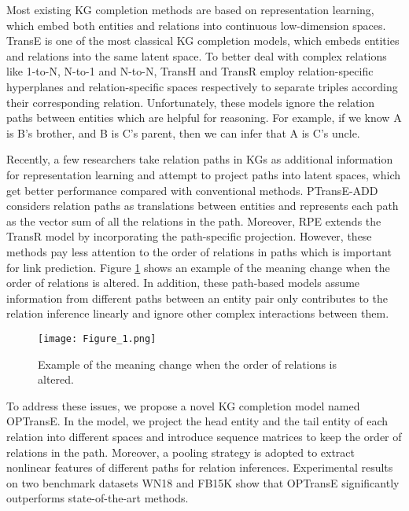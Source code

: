 \documentclass[11pt,a4paper]{article}
\begin{document}
Most existing KG completion methods are based on representation
learning, which embed both entities and relations into continuous
low-dimension spaces. TransE \cite{bordes2013translating} is one of
the most classical KG completion models, which embeds entities and
relations into the same latent space. To better deal with complex
relations like 1-to-N, N-to-1 and N-to-N, TransH
\cite{wang2014knowledge} and TransR \cite{lin2015learning} employ
relation-specific hyperplanes and relation-specific spaces respectively to
separate triples according their corresponding relation. Unfortunately, these
models ignore the relation paths between entities which are helpful
for reasoning. For example, if we know A is B's brother, and B is
C's parent, then we can infer that A is C's uncle.

Recently, a few researchers take relation paths in KGs as additional
information for representation learning and attempt to project paths
into latent spaces, which get better performance compared with
conventional methods. PTransE-ADD \cite{lin2015modeling} considers
relation paths as translations between entities and represents each
path as the vector sum of all the relations in the path. Moreover,
RPE \cite{lin2018relation} extends the TransR model by incorporating
the path-specific projection. However, these methods pay less
attention to the order of relations in paths which is important for
link prediction. Figure \ref{example} shows an example of the
meaning change when the order of relations is altered. In
addition, these path-based models assume information from different
paths between an entity pair only contributes to the relation inference linearly
and ignore other complex interactions between them.


\begin{figure}[]
    \centering
    \texttt{[image: Figure\_1.png]}
    \caption{Example of the meaning change when the order of relations is altered.}
    \label{example}
\end{figure}


To address these issues, we propose a novel KG completion model
named OPTransE. In the model, we project the head entity and the
tail entity of each relation into different spaces and introduce sequence matrices to keep
the order of relations in the path. Moreover, a pooling strategy is adopted to
extract nonlinear features of different paths for relation
inferences. Experimental results on two benchmark datasets WN18 and
FB15K show that OPTransE significantly outperforms state-of-the-art
methods.
\end{document}
